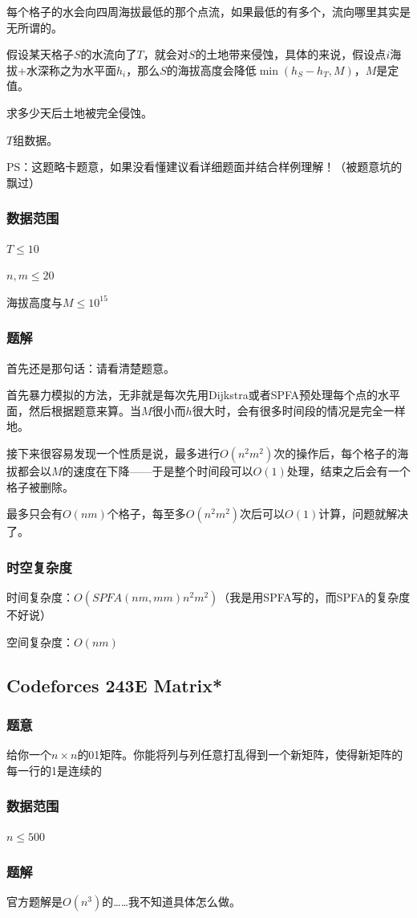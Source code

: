 \documentclass{ctexart}
\begin{document}
每个格子的水会向四周海拔最低的那个点流，如果最低的有多个，流向哪里其实是无所谓的。

假设某天格子$S$的水流向了$T$，就会对$S$的土地带来侵蚀，具体的来说，假设点$i$海拔+水深称之为水平面$h_i$，那么$S$的海拔高度会降低$\min(h_S-h_T,M)$，$M$是定值。

求多少天后土地被完全侵蚀。

$T$组数据。

PS：这题略卡题意，如果没看懂建议看详细题面并结合样例理解！（被题意坑的飘过）
\subsubsection{数据范围}
$T \le 10$

$n,m \le 20$

海拔高度与$M \le 10^{15}$
\subsubsection{题解}
首先还是那句话：请看清楚题意。

首先暴力模拟的方法，无非就是每次先用Dijkstra或者SPFA预处理每个点的水平面，然后根据题意来算。当$M$很小而$h$很大时，会有很多时间段的情况是完全一样地。

接下来很容易发现一个性质是说，最多进行$O(n^2m^2)$次的操作后，每个格子的海拔都会以$M$的速度在下降——于是整个时间段可以$O(1)$处理，结束之后会有一个格子被删除。

最多只会有$O(nm)$个格子，每至多$O(n^2m^2)$次后可以$O(1)$计算，问题就解决了。
\subsubsection{时空复杂度}
时间复杂度：$O(SPFA(nm,mm)n^2m^2)$（我是用SPFA写的，而SPFA的复杂度不好说）

空间复杂度：$O(nm)$
\subsection{Codeforces 243E Matrix*}
\subsubsection{题意}
给你一个$n \times n$的01矩阵。你能将列与列任意打乱得到一个新矩阵，使得新矩阵的每一行的1是连续的
\subsubsection{数据范围}
$n \le 500$
\subsubsection{题解}
官方题解是$O(n^3)$的……我不知道具体怎么做。
\end{document}
